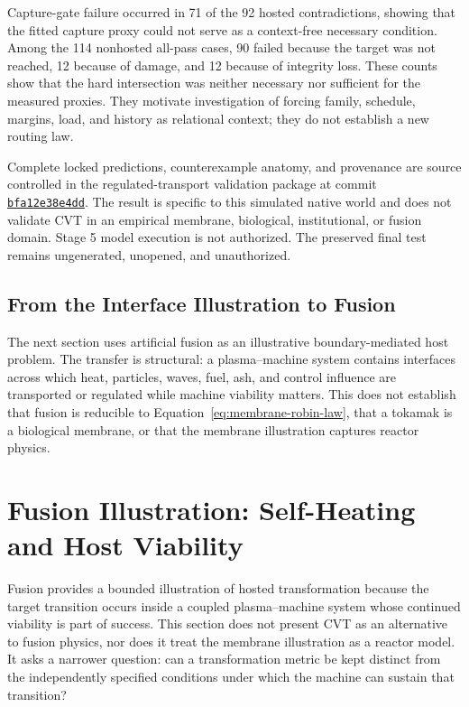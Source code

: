 \documentclass[11pt]{article}
\begin{document}
Capture-gate failure occurred in 71 of the 92 hosted contradictions, showing that the fitted capture proxy could not serve as a context-free necessary condition. Among the 114 nonhosted all-pass cases, 90 failed because the target was not reached, 12 because of damage, and 12 because of integrity loss. These counts show that the hard intersection was neither necessary nor sufficient for the measured proxies. They motivate investigation of forcing family, schedule, margins, load, and history as relational context; they do not establish a new routing law.

Complete locked predictions, counterexample anatomy, and provenance are source controlled in the regulated-transport validation package at commit \href{https://github.com/dmvarela/CVTRepository/commit/bfa12e38e4ddef89d2d76ed2b04577e56bcbafc1}{\texttt{bfa12e38e4dd}}. The result is specific to this simulated native world and does not validate CVT in an empirical membrane, biological, institutional, or fusion domain. Stage 5 model execution is not authorized. The preserved final test remains ungenerated, unopened, and unauthorized.

\subsection{From the Interface Illustration to Fusion}

The next section uses artificial fusion as an illustrative boundary-mediated host problem. The transfer is structural: a plasma--machine system contains interfaces across which heat, particles, waves, fuel, ash, and control influence are transported or regulated while machine viability matters. This does not establish that fusion is reducible to Equation~\eqref{eq:membrane-robin-law}, that a tokamak is a biological membrane, or that the membrane illustration captures reactor physics.

\section{Fusion Illustration: Self-Heating and Host Viability}
\label{sec:fusion}

Fusion provides a bounded illustration of hosted transformation because the target transition occurs inside a coupled plasma--machine system whose continued viability is part of success. This section does not present CVT as an alternative to fusion physics, nor does it treat the membrane illustration as a reactor model. It asks a narrower question: can a transformation metric be kept distinct from the independently specified conditions under which the machine can sustain that transition?
\end{document}
